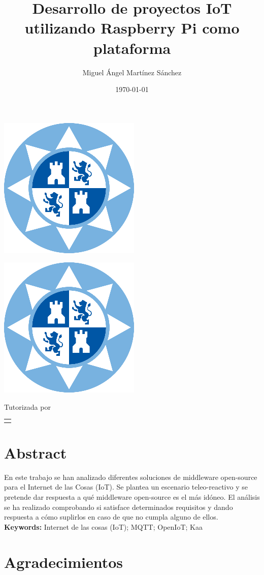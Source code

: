 \documentclass[12pt, twoside]{book}
\title{Desarrollo de proyectos IoT utilizando Raspberry Pi como plataforma}
\author{Miguel Ángel Martínez Sánchez}
\date{\today}
\makeatletter
\renewcommand\maketitle{%
  \begin{titlepage}
      \vspace*{1.5cm}
      \parskip=0pt
      \Huge\bfseries
      \begin{center}
          \leavevmode\includegraphics[totalheight=6cm]{sello.png}\\[2cm]
          \@title
      \end{center}
      \vspace{1cm}
      \begin{center}
          \@author
      \end{center}
  \end{titlepage}
  
  \begin{titlepage}
  \parindent=0pt
  \begin{flushleft}
  \vspace*{1.5mm}
  \setlength\baselineskip{0pt}
  \setlength\parskip{0mm}
  \begin{center}
      \leavevmode\includegraphics[totalheight=4.5cm]{sello.png}
  \end{center}
  \end{flushleft}
  \vspace{1cm}
  \bgroup
  \Large \bfseries
  \begin{center}
  \@title
  \end{center}
  \egroup
  \vspace*{.5cm}
  \begin{center}
  \@author
  \end{center}
  \vspace*{1.8cm}
  \begin{flushright}
  \begin{minipage}{8.45cm}

      \vspace*{7.5mm}

      Tutorizada por
  \end{minipage}\par
  \begin{tabularx}{8.45cm}[b]{@{}l}
      \guardatutores
  \end{tabularx}
   \end{flushright}
      \vspace*{\fill}
   \end{titlepage}
   \pagestyle{tfg}
   \renewcommand{\chaptermark}[1]{\markright{\thechapter.\space ##1}}
   \renewcommand{\sectionmark}[1]{}
   \renewcommand{\subsectionmark}[1]{}
  }
\makeatother
\begin{document}
 

\maketitle

\frontmatter
\tableofcontents

\mainmatter


\chapter*{Abstract}
En este trabajo se han analizado diferentes soluciones de middleware open-source para el Internet de las Cosas (IoT). Se plantea un escenario teleo-reactivo y se pretende dar respuesta a qué middleware open-source es el más idóneo. El análisis se ha realizado comprobando si satisface determinados requisitos y dando respuesta a cómo suplirlos en caso de que no cumpla alguno de ellos.\\

\textbf{Keywords:} Internet de las cosas (IoT); MQTT; OpenIoT; Kaa


\chapter*{Agradecimientos}



\end{document}
